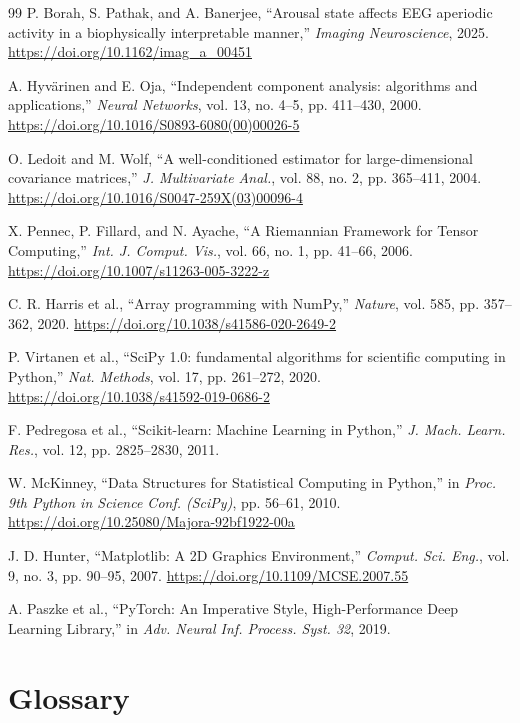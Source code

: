 \documentclass[11pt]{article}
\begin{document}
\begin{thebibliography}{99}
 P. Borah, S. Pathak, and A. Banerjee, ``Arousal state affects EEG aperiodic activity in a biophysically interpretable manner,'' \emph{Imaging Neuroscience}, 2025. \url{https://doi.org/10.1162/imag_a_00451}

 A. Hyv\"arinen and E. Oja, ``Independent component analysis: algorithms and applications,'' \emph{Neural Networks}, vol. 13, no. 4--5, pp. 411--430, 2000. \url{https://doi.org/10.1016/S0893-6080(00)00026-5}

 O. Ledoit and M. Wolf, ``A well-conditioned estimator for large-dimensional covariance matrices,'' \emph{J. Multivariate Anal.}, vol. 88, no. 2, pp. 365--411, 2004. \url{https://doi.org/10.1016/S0047-259X(03)00096-4}

 X. Pennec, P. Fillard, and N. Ayache, ``A Riemannian Framework for Tensor Computing,'' \emph{Int. J. Comput. Vis.}, vol. 66, no. 1, pp. 41--66, 2006. \url{https://doi.org/10.1007/s11263-005-3222-z}

 C. R. Harris et al., ``Array programming with NumPy,'' \emph{Nature}, vol. 585, pp. 357--362, 2020. \url{https://doi.org/10.1038/s41586-020-2649-2}

 P. Virtanen et al., ``SciPy 1.0: fundamental algorithms for scientific computing in Python,'' \emph{Nat. Methods}, vol. 17, pp. 261--272, 2020. \url{https://doi.org/10.1038/s41592-019-0686-2}

 F. Pedregosa et al., ``Scikit-learn: Machine Learning in Python,'' \emph{J. Mach. Learn. Res.}, vol. 12, pp. 2825--2830, 2011.

 W. McKinney, ``Data Structures for Statistical Computing in Python,'' in \emph{Proc. 9th Python in Science Conf. (SciPy)}, pp. 56--61, 2010. \url{https://doi.org/10.25080/Majora-92bf1922-00a}

 J. D. Hunter, ``Matplotlib: A 2D Graphics Environment,'' \emph{Comput. Sci. Eng.}, vol. 9, no. 3, pp. 90--95, 2007. \url{https://doi.org/10.1109/MCSE.2007.55}

 A. Paszke et al., ``PyTorch: An Imperative Style, High-Performance Deep Learning Library,'' in \emph{Adv. Neural Inf. Process. Syst. 32}, 2019.

\end{thebibliography}

\appendix

\section{Glossary}
\end{document}
